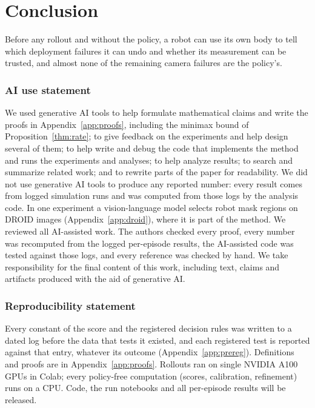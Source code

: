 \documentclass{article}
\begin{document}
\section{Conclusion}
Before any rollout and without the policy, a robot can use its own body to tell which deployment failures it can undo
and whether its measurement can be trusted, and almost none of the remaining camera failures are the policy's.

\subsubsection*{AI use statement}
We used generative AI tools to help formulate mathematical claims and write the proofs in
Appendix~\ref{app:proofs}, including the minimax bound of Proposition~\ref{thm:rate}; to give feedback on the
experiments and help design several of them; to help write and debug the code that implements the method and runs the
experiments and analyses; to help analyze results; to search and summarize related work; and to rewrite parts of the
paper for readability. We did not use generative AI tools to produce any reported number: every result comes from
logged simulation runs and was computed from those logs by the analysis code. In one experiment a vision-language model
selects robot mask regions on DROID images (Appendix~\ref{app:droid}), where it is part of the method. We reviewed all
AI-assisted work. The authors checked every proof, every number was recomputed from the logged per-episode results, the
AI-assisted code was tested against those logs, and every reference was checked by hand. We take responsibility for the
final content of this work, including text, claims and artifacts produced with the aid of generative AI.

\subsubsection*{Reproducibility statement}
Every constant of the score and the registered decision rules was written to a dated log before the
data that tests it existed, and each registered test is reported against that entry, whatever its outcome
(Appendix~\ref{app:prereg}). Definitions and proofs are in Appendix~\ref{app:proofs}. Rollouts ran on single NVIDIA
A100 GPUs in Colab; every policy-free computation (scores, calibration, refinement) runs on a CPU. Code, the run
notebooks and all per-episode results will be released.



\end{document}
